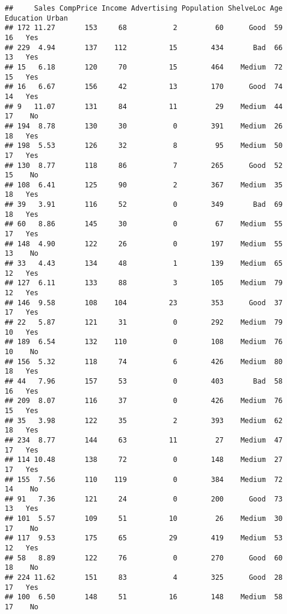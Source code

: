 \documentclass[
]{article}
\begin{document}
\begin{verbatim}
##     Sales CompPrice Income Advertising Population ShelveLoc Age Education Urban
## 172 11.27       153     68           2         60      Good  59        16   Yes
## 229  4.94       137    112          15        434       Bad  66        13   Yes
## 15   6.18       120     70          15        464    Medium  72        15   Yes
## 16   6.67       156     42          13        170      Good  74        14   Yes
## 9   11.07       131     84          11         29    Medium  44        17    No
## 194  8.78       130     30           0        391    Medium  26        18   Yes
## 198  5.53       126     32           8         95    Medium  50        17   Yes
## 130  8.77       118     86           7        265      Good  52        15    No
## 108  6.41       125     90           2        367    Medium  35        18   Yes
## 39   3.91       116     52           0        349       Bad  69        18   Yes
## 60   8.86       145     30           0         67    Medium  55        17   Yes
## 148  4.90       122     26           0        197    Medium  55        13    No
## 33   4.43       134     48           1        139    Medium  65        12   Yes
## 127  6.11       133     88           3        105    Medium  79        12   Yes
## 146  9.58       108    104          23        353      Good  37        17   Yes
## 22   5.87       121     31           0        292    Medium  79        10   Yes
## 189  6.54       132    110           0        108    Medium  76        10    No
## 156  5.32       118     74           6        426    Medium  80        18   Yes
## 44   7.96       157     53           0        403       Bad  58        16   Yes
## 209  8.07       116     37           0        426    Medium  76        15   Yes
## 35   3.98       122     35           2        393    Medium  62        18   Yes
## 234  8.77       144     63          11         27    Medium  47        17   Yes
## 114 10.48       138     72           0        148    Medium  27        17   Yes
## 155  7.56       110    119           0        384    Medium  72        14    No
## 91   7.36       121     24           0        200      Good  73        13   Yes
## 101  5.57       109     51          10         26    Medium  30        17    No
## 117  9.53       175     65          29        419    Medium  53        12   Yes
## 58   8.89       122     76           0        270      Good  60        18    No
## 224 11.62       151     83           4        325      Good  28        17   Yes
## 100  6.50       148     51          16        148    Medium  58        17    No

\end{verbatim}
\end{document}
